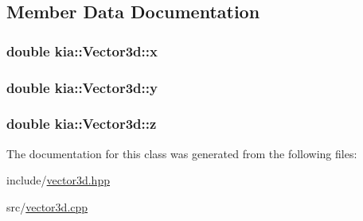 \subsection{Member Data Documentation}
\hypertarget{classkia_1_1Vector3d_a6fde3f43e58f79e4a505bd100155ea17}{
\subsubsection[{x}]{\setlength{\rightskip}{0pt plus 5cm}double kia\-::\-Vector3d\-::x}}\label{classkia_1_1Vector3d_a6fde3f43e58f79e4a505bd100155ea17}
\hypertarget{classkia_1_1Vector3d_ae2c31b91dd82f1ced679d47ff69a0af5}{
\subsubsection[{y}]{\setlength{\rightskip}{0pt plus 5cm}double kia\-::\-Vector3d\-::y}}\label{classkia_1_1Vector3d_ae2c31b91dd82f1ced679d47ff69a0af5}
\hypertarget{classkia_1_1Vector3d_af227022a04148d9f14c8bbb6bb3c6c2c}{
\subsubsection[{z}]{\setlength{\rightskip}{0pt plus 5cm}double kia\-::\-Vector3d\-::z}}\label{classkia_1_1Vector3d_af227022a04148d9f14c8bbb6bb3c6c2c}


The documentation for this class was generated from the following files\-:\begin{DoxyCompactItemize}
\item 
include/\hyperlink{vector3d_8hpp}{vector3d.\-hpp}\item 
src/\hyperlink{vector3d_8cpp}{vector3d.\-cpp}\end{DoxyCompactItemize}
